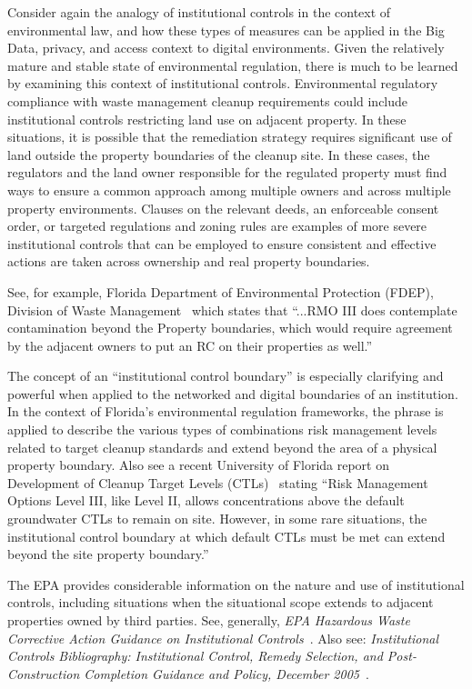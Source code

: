 Consider again the analogy of institutional controls in the context of environmental law, and how these types of measures can be applied in the Big Data, privacy, and access context to digital environments.
Given the relatively mature and stable state of environmental regulation, there is much to be learned by examining this context of institutional controls.
Environmental regulatory compliance with waste management cleanup requirements could include institutional controls restricting land use on adjacent property.
In these situations, it is possible that the remediation strategy requires significant use of land outside the property boundaries of the cleanup site. 
In these cases, the regulators and the land owner responsible for the regulated property must find ways to ensure a common approach among multiple owners and across multiple property environments.
Clauses on the relevant deeds, an enforceable consent order, or targeted regulations and zoning rules are examples of more severe institutional controls that can be employed to ensure consistent and effective actions are taken across ownership and real property boundaries.

See, for example, Florida Department of Environmental Protection (FDEP), Division of Waste Management~\cite{FloridaEPA2012} which states that
``...RMO III does contemplate contamination beyond the Property boundaries, which would require agreement by the adjacent owners to put an RC on their properties as well.''

The concept of an ``institutional control boundary'' is especially clarifying and powerful when applied to the networked and digital boundaries of an institution.
In the context of Florida's environmental regulation frameworks, the phrase is applied to describe the various types of combinations risk management levels related to target cleanup standards and extend beyond the area of a physical property boundary.
Also see a recent University of Florida report on Development of Cleanup Target Levels (CTLs)~\cite{UFlorida2005} stating
``Risk Management Options Level III, like Level II, allows concentrations above the default groundwater CTLs to remain on site.
However, in some rare situations, the institutional control boundary at which default CTLs must be met can extend beyond the site property boundary.''

The EPA provides considerable information on the nature and use of institutional controls, including situations when the situational scope extends to adjacent properties owned by third parties.
See, generally, {\em EPA Hazardous Waste Corrective Action Guidance on Institutional Controls}~\cite{EPA2007}.
Also see: {\em Institutional Controls Bibliography: Institutional Control, Remedy Selection, and Post-Construction Completion Guidance and Policy, December 2005}~\cite{EPAbibliography2005}.

